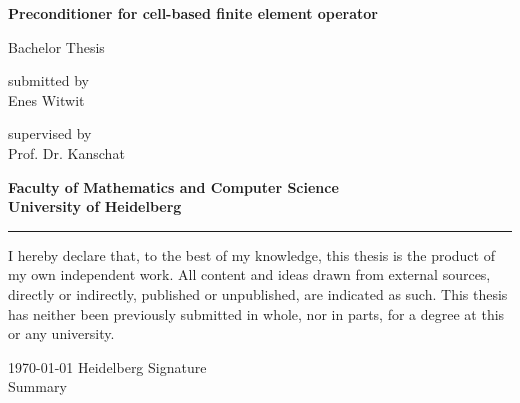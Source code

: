 \documentclass[12pt,a4paper]{scrartcl}
\numberwithin{equation}{section}
\begin{document}
\pagestyle{empty}




\begin{titlepage}

\vspace*{1cm} 
\begin{center} 


\textbf{\Huge Preconditioner for cell-based finite element operator} 
\vspace*{2cm}

{\Large Bachelor Thesis}
\vspace*{1cm}


submitted by \\[0.5cm]

{\Large Enes Witwit}
\vspace*{1cm}

supervised by  \\[0.5cm]
{\Large Prof. Dr. Kanschat}
\vspace*{3cm}

\textbf{
Faculty of Mathematics and Computer Science\\[1cm]
University of Heidelberg}
\end{center}
\end{titlepage}



\newpage
\thispagestyle{empty}
\vspace*{14cm}

\noindent\rule{16cm}{0.4pt}

I hereby declare that, to the best of my knowledge, this thesis is the product of my own independent
work. All content and ideas drawn from external sources, directly or indirectly, published
or unpublished, are indicated as such. This thesis has neither been previously submitted in
whole, nor in parts, for a degree at this or any university. \\[2ex] 

\noindent

\today \hspace*{1cm}  Heidelberg \hspace*{5cm} Signature\\[5ex]


\newpage
Summary
\end{document}
